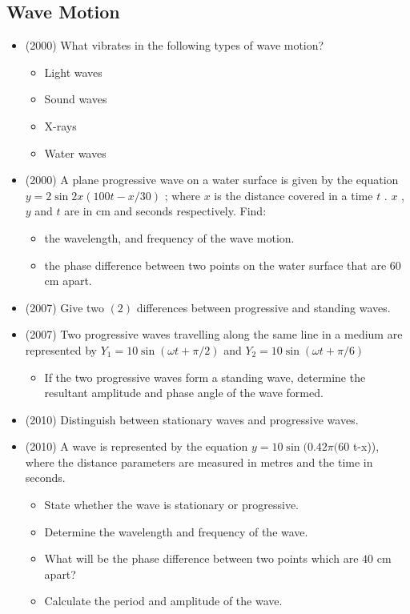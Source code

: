 \documentclass{article}
\begin{document}
\subsection{Wave Motion}
\begin{itemize}
\item (2000)  What vibrates in the following types of wave motion?\begin{itemize}
\item Light waves
\item Sound waves
\item X-rays
\item Water waves
\end{itemize}
\item (2000)  A plane progressive wave on a water surface is given by the equation $ y=2 \sin 2x(100t -x/30)$ ; where $ x$ is the distance covered in a time $ t$ . $ x$ , $ y$ and $ t$ are in cm and seconds respectively.  Find:\begin{itemize}
\item the wavelength, and frequency of the wave motion.
\item the phase difference between two points on the water surface that are $ 60$ cm apart.
\end{itemize}
\item (2007)  Give two $ (2)$ differences between progressive and standing waves.
\item (2007)  Two progressive waves travelling along the same line in a medium are represented by $ Y_{1}=10 \sin(\omega t +\pi/2)$ and $ Y_{2}=10 \sin(\omega t +\pi/6)$\begin{itemize}
\item If the two progressive waves form a standing wave, determine the resultant amplitude and phase angle of the wave formed.
\end{itemize}
\item (2010)  Distinguish between stationary waves and progressive waves.
\item (2010)  A wave is represented by the equation $ y=10 \sin(0.42\pi(60$ t-x)), where the distance parameters are measured in metres and the time in seconds.\begin{itemize}
\item State whether the wave is stationary or progressive.
\item Determine the wavelength and frequency of the wave.
\item What will be the phase difference between two points which are $ 40$ cm apart? 
\item Calculate the period and amplitude of the wave. 

\end{itemize}
\end{itemize}
\end{document}
